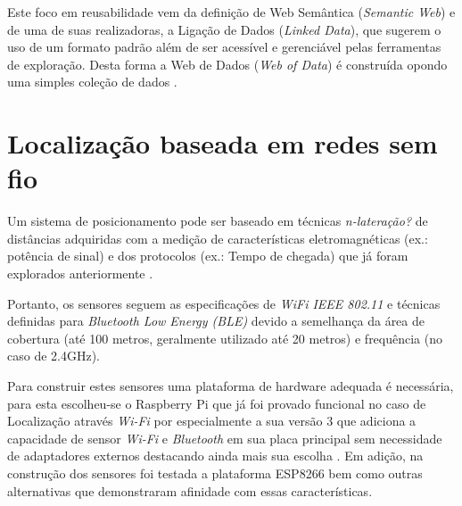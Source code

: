 Este foco em reusabilidade vem da definição de Web Semântica (\emph{Semantic
Web}) e de uma de suas realizadoras, a Ligação de Dados (\emph{Linked Data}),
que sugerem o uso de um formato padrão além de ser acessível e gerenciável pelas
ferramentas de exploração. Desta forma a Web de Dados (\emph{Web of Data}) é
construída opondo uma simples coleção de dados \cite{Bizer2009}.

\section{Localização baseada em redes sem fio}
\label{sec:Localização baseada em redes sem fio}

Um sistema de posicionamento pode ser baseado em técnicas
\emph{n-lateração?} de distâncias adquiridas com a medição de características
eletromagnéticas (ex.: potência de sinal) e dos protocolos (ex.: Tempo de
chegada) que já foram explorados anteriormente \cite{Abusubaih2007,
bahillo2009ieee, Feldmann2003}.

Portanto, os sensores seguem as especificações de \emph{WiFi IEEE 802.11}
\cite{Crow1997} e técnicas definidas para \emph{Bluetooth Low Energy (BLE)}
\cite{Hossain2007} devido a semelhança da área de cobertura (até 100 metros,
geralmente utilizado até 20 metros) e frequência (no caso de 2.4GHz).

Para construir estes sensores uma plataforma de hardware adequada é necessária,
para esta escolheu-se o Raspberry Pi \cite{Vujovic2014, Vujovic2015} que já
foi provado funcional no caso de Localização através \emph{Wi-Fi} por
 especialmente a sua versão 3 que adiciona a capacidade
de sensor \emph{Wi-Fi} e \emph{Bluetooth} em sua placa principal sem
necessidade de adaptadores externos destacando ainda mais sua escolha
\cite{RPI2016}. Em adição, na construção dos sensores foi testada a plataforma ESP8266 bem como
outras alternativas que demonstraram afinidade com essas características.
